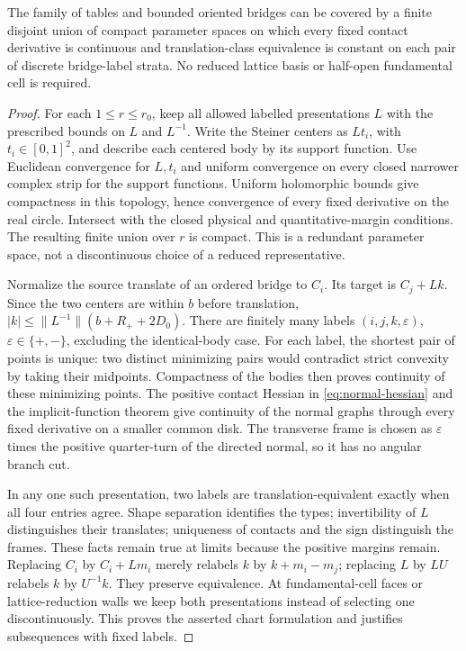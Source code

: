 \begin{lemma}
\label{lem:presentation-compactness}
The family of tables and bounded oriented bridges can be covered by a
finite disjoint union of compact parameter spaces on which every fixed
contact derivative is continuous and translation-class equivalence is
constant on each pair of discrete bridge-label strata. No reduced
lattice basis or half-open fundamental cell is required.
\end{lemma}
\begin{proof}
For each $1\le r\le r_0$, keep all allowed labelled presentations
$L$ with the prescribed bounds on $L$ and $L^{-1}$. Write the Steiner
centers as $Lt_i$, with $t_i\in[0,1]^2$, and describe each centered
body by its support function. Use Euclidean convergence for $L,t_i$
and uniform convergence on every closed narrower complex strip for the
support functions. Uniform holomorphic bounds give compactness in this
topology, hence convergence of every fixed derivative on the real circle.
Intersect with the closed physical and quantitative-margin conditions.
The resulting finite union over $r$ is compact. This is a redundant
parameter space, not a discontinuous choice of a reduced representative.

Normalize the source translate of an ordered bridge to $C_i$. Its target
is $C_j+Lk$. Since the two centers are within $b$ before translation,
$|k|\le\|L^{-1}\|(b+R_++2D_0)$. There are finitely many labels
$(i,j,k,\varepsilon)$, $\varepsilon\in\{+,-\}$, excluding the
identical-body case. For each label, the shortest pair of points is
unique: two distinct minimizing pairs would contradict strict convexity
by taking their midpoints. Compactness of the bodies then proves
continuity of these minimizing points. The positive contact Hessian
in \eqref{eq:normal-hessian} and the implicit-function theorem give
continuity of the normal graphs through every fixed derivative on a
smaller common disk. The transverse frame is chosen as $\varepsilon$
times the positive quarter-turn of the directed normal, so it has no
angular branch cut.

In any one such presentation, two labels are translation-equivalent
exactly when all four entries agree. Shape separation identifies the
types; invertibility of $L$ distinguishes their translates; uniqueness
of contacts and the sign distinguish the frames. These facts remain
true at limits because the positive margins remain. Replacing $C_i$
by $C_i+Lm_i$ merely relabels $k$ by $k+m_i-m_j$; replacing $L$
by $LU$ relabels $k$ by $U^{-1}k$. They preserve equivalence. At
fundamental-cell faces or lattice-reduction walls we keep both
presentations instead of selecting one discontinuously. This proves the
asserted chart formulation and justifies subsequences with fixed labels.
\end{proof}

